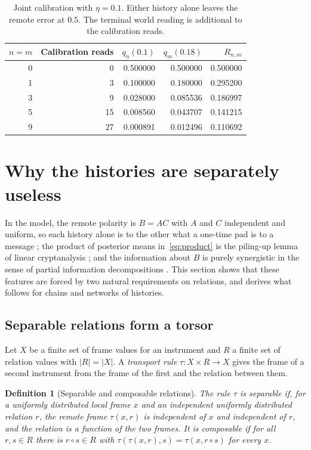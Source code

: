 \documentclass[11pt,a4paper]{article}
\newtheorem{definition}{Definition}[section]
\begin{document}
\begin{table}[ht]
\centering
\begin{tabular}{rrrrr}
\toprule
$n=m$ & Calibration reads & $q_n(0.1)$ & $q_m(0.18)$ & $R_{n,m}$\\
\midrule
0 & 0 & 0.500000 & 0.500000 & 0.500000\\
1 & 3 & 0.100000 & 0.180000 & 0.295200\\
3 & 9 & 0.028000 & 0.085536 & 0.186997\\
5 & 15 & 0.008560 & 0.043707 & 0.141215\\
9 & 27 & 0.000891 & 0.012496 & 0.110692\\
\bottomrule
\end{tabular}
\caption{Joint calibration with $\eta=0.1$. Either history alone leaves the remote error at $0.5$. The terminal world reading is additional to the calibration reads.}\label{tab:history}
\end{table}

\section{Why the histories are separately useless}\label{sec:structure}

In the model, the remote polarity is $B=AC$ with $A$ and $C$ independent and uniform, so each history alone is to the other what a one-time pad is to a message \cite{Shannon1949}; the product of posterior means in~\eqref{eq:product} is the piling-up lemma of linear cryptanalysis \cite{Matsui1993}; and the information about $B$ is purely synergistic in the sense of partial information decompositions \cite{WilliamsBeer2010}. This section shows that these features are forced by two natural requirements on relations, and derives what follows for chains and networks of histories.

\subsection{Separable relations form a torsor}

Let $X$ be a finite set of frame values for an instrument and $R$ a finite set of relation values with $|R|=|X|$. A \emph{transport rule} $\tau:X\times R\to X$ gives the frame of a second instrument from the frame of the first and the relation between them.

\begin{definition}[Separable and composable relations]\label{def:separable}
The rule $\tau$ is \emph{separable} if, for a uniformly distributed local frame $x$ and an independent uniformly distributed relation $r$, the remote frame $\tau(x,r)$ is independent of $x$ and independent of $r$, and the relation is a function of the two frames. It is \emph{composable} if for all $r,s\in R$ there is $r\circ s\in R$ with $\tau(\tau(x,r),s)=\tau(x,r\circ s)$ for every $x$.
\end{definition}
\end{document}

